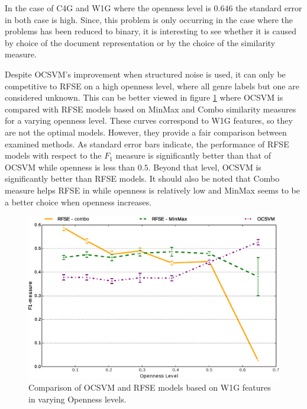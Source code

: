 In the case of C4G and W1G where the openness level is $0.646$ the standard error in both case is high. Since, this problem is only occurring in the case where the problems has been reduced to binary, it is interesting to see whether it is caused by choice of the document representation or by the choice of the similarity measure.


Despite OCSVM's improvement when structured noise is used, it can only be competitive to RFSE on a high openness level, where all genre labels but one are considered unknown. This can be better viewed in figure \ref{chap:noise:fig:RFSE_vs_OCSVME_W1G_openness_test} where OCSVM is compared with RFSE models based on MinMax and Combo similarity measures for a varying openness level. These curves correspond to W1G features, so they are not the optimal models. However, they provide a fair comparison between examined methods. As standard error bars indicate, the performance of RFSE models with respect to the $F_{1}$ measure is significantly better than that of OCSVM while openness is less than $0.5$. Beyond that level, OCSVM is significantly better than RFSE models. It should also be noted that Combo measure helps RFSE in while openness is relatively low and MinMax seems to be a better choice when openness increases.

\begin{figure}[H]
\begin{center}
    \includegraphics[scale=0.45]{Figures/RFSE_vs_OCSVME_W1G.eps}
	\caption{Comparison of OCSVM and RFSE models based on W1G features in varying Openness levels.}
	\label{chap:noise:fig:RFSE_vs_OCSVME_W1G_openness_test}
\end{center}
\end{figure}

